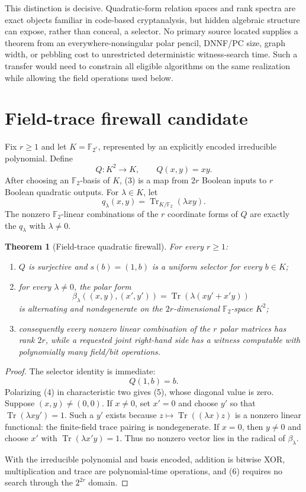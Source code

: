 \documentclass[11pt]{article}
\newtheorem{theorem}{Theorem}
\newcommand{\F}{\mathbb F_2}
\begin{document}
This distinction is decisive.  Quadratic-form relation spaces and rank
spectra are exact objects familiar in code-based cryptanalysis, but hidden
algebraic structure can expose, rather than conceal, a selector.  No primary
source located supplies a theorem from an everywhere-nonsingular polar pencil,
DNNF/PC size, graph width, or pebbling cost to unrestricted deterministic
witness-search time.  Such a transfer would need to constrain all eligible
algorithms on the same realization while allowing the field operations used
below.

\section{Field-trace firewall candidate}
Fix $r\ge1$ and let $K=\mathbb F_{2^r}$, represented by an explicitly encoded
irreducible polynomial.  Define
\[
Q:K^2\longrightarrow K,\qquad Q(x,y)=xy.                 \tag{3}
\]
After choosing an $\F$-basis of $K$, (3) is a map from $2r$ Boolean inputs to
$r$ Boolean quadratic outputs.  For $\lambda\in K$, let
\[
q_\lambda(x,y)=\operatorname{Tr}_{K/\F}(\lambda xy).     \tag{4}
\]
The nonzero $\F$-linear combinations of the $r$ coordinate forms of $Q$ are
exactly the $q_\lambda$ with $\lambda\ne0$.

\begin{theorem}[Field-trace quadratic firewall]
For every $r\ge1$:
\begin{enumerate}
\item $Q$ is surjective and $s(b)=(1,b)$ is a uniform selector for every
$b\in K$;
\item for every $\lambda\ne0$, the polar form
\[
\beta_\lambda((x,y),(x',y'))
=\operatorname{Tr}\!\left(\lambda(xy'+x'y)\right)       \tag{5}
\]
is alternating and nondegenerate on the $2r$-dimensional $\F$-space $K^2$;
\item consequently every nonzero linear combination of the $r$ polar
matrices has rank $2r$, while a requested joint right-hand side has a witness
computable with polynomially many field/bit operations.
\end{enumerate}
\end{theorem}
\begin{proof}
The selector identity is immediate:
\[
Q(1,b)=b.                                                \tag{6}
\]
Polarizing (4) in characteristic two gives (5), whose diagonal value is zero.
Suppose $(x,y)\ne(0,0)$.  If $x\ne0$, set $x'=0$ and choose $y'$ so that
$\operatorname{Tr}(\lambda x y')=1$.  Such a $y'$ exists because
$z\mapsto\operatorname{Tr}((\lambda x)z)$ is a nonzero linear functional:
the finite-field trace pairing is nondegenerate.  If $x=0$, then $y\ne0$ and
choose $x'$ with $\operatorname{Tr}(\lambda x'y)=1$.
Thus no nonzero vector lies in the radical of $\beta_\lambda$.

With the irreducible polynomial and basis encoded, addition is bitwise XOR,
multiplication and trace are polynomial-time operations, and (6) requires no
search through the $2^{2r}$ domain.
\end{proof}
\end{document}

